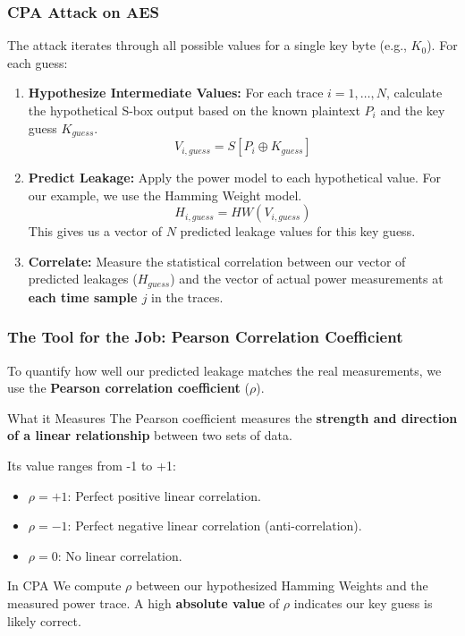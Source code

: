 \begin{frame}
    \frametitle{CPA Attack on AES}

    The attack iterates through all possible values for a single key byte (e.g., $K_0$). For each guess:

    \begin{enumerate}
        \item \textbf{Hypothesize Intermediate Values:} For each trace $i=1, \dots, N$, calculate the hypothetical S-box output based on the known plaintext $P_i$ and the key guess $K_{guess}$.
        \[ V_{i, guess} = S[P_i \oplus K_{guess}] \]

        \item \textbf{Predict Leakage:} Apply the power model to each hypothetical value. For our example, we use the Hamming Weight model.
        \[ H_{i, guess} = HW(V_{i, guess}) \]
        This gives us a vector of $N$ predicted leakage values for this key guess.

        \item \textbf{Correlate:} Measure the statistical correlation between our vector of predicted leakages ($H_{guess}$) and the vector of actual power measurements at \textbf{each time sample $j$} in the traces.
    \end{enumerate}
\end{frame}

\begin{frame}
    \frametitle{The Tool for the Job: Pearson Correlation Coefficient}

    To quantify how well our predicted leakage matches the real measurements, we use the \textbf{Pearson correlation coefficient} ($\rho$).

    \begin{block}{What it Measures}
        The Pearson coefficient measures the \textbf{strength and direction of a linear relationship} between two sets of data.
    \end{block}

    Its value ranges from -1 to +1:
    \begin{itemize}
        \item $\rho = +1$: Perfect positive linear correlation.
        \item $\rho = -1$: Perfect negative linear correlation (anti-correlation).
        \item $\rho = 0$: No linear correlation.
    \end{itemize}

    \begin{alertblock}{In CPA}
    We compute $\rho$ between our hypothesized Hamming Weights and the measured power trace. A high \textbf{absolute value} of $\rho$ indicates our key guess is likely correct.
    \end{alertblock}
\end{frame}

